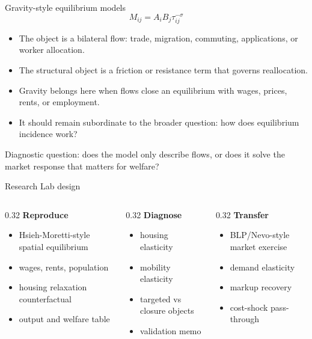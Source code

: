 \documentclass[aspectratio=169,11pt]{beamer}
\newcommand{\1}{\mathbf{1}}
\begin{document}
\begin{frame}{Gravity-style equilibrium models}
\small
\[
M_{ij}
=
A_iB_j\tau_{ij}^{-\sigma}
\]

\begin{itemize}
    \item The object is a bilateral flow: trade, migration, commuting, applications, or worker allocation.
    \item The structural object is a friction or resistance term that governs reallocation.
    \item Gravity belongs here when flows close an equilibrium with wages, prices, rents, or employment.
    \item It should remain subordinate to the broader question: how does equilibrium incidence work?
\end{itemize}

\medskip
Diagnostic question: does the model only describe flows, or does it solve the market response that matters for welfare?
\end{frame}

\begin{frame}{Research Lab design}
\begin{columns}[T,onlytextwidth]
\begin{column}{0.32\linewidth}
\textbf{Reproduce}
\begin{itemize}
    \item Hsieh-Moretti-style spatial equilibrium
    \item wages, rents, population
    \item housing relaxation counterfactual
    \item output and welfare table
\end{itemize}
\end{column}
\begin{column}{0.32\linewidth}
\textbf{Diagnose}
\begin{itemize}
    \item housing elasticity
    \item mobility elasticity
    \item targeted vs closure objects
    \item validation memo
\end{itemize}
\end{column}
\begin{column}{0.32\linewidth}
\textbf{Transfer}
\begin{itemize}
    \item BLP/Nevo-style market exercise
    \item demand elasticity
    \item markup recovery
    \item cost-shock pass-through
\end{itemize}
\end{column}
\end{columns}
\end{frame}
\end{document}
